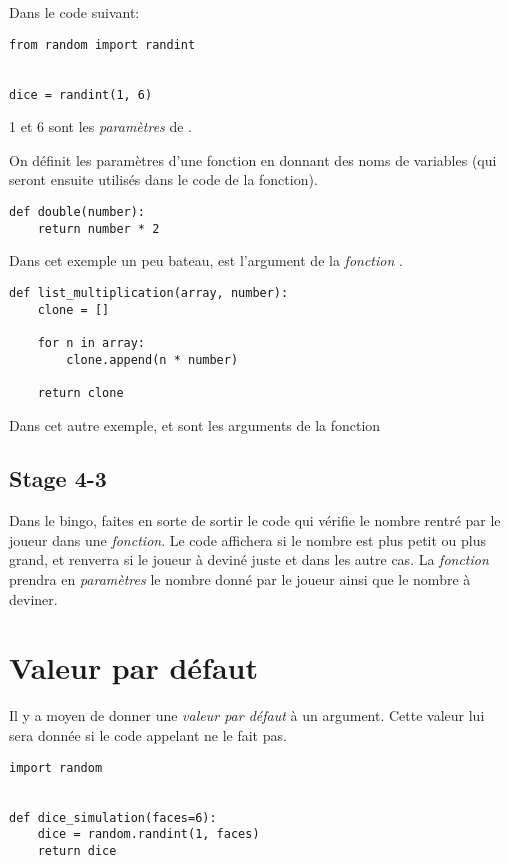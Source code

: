 Dans le code suivant:

\begin{lstlisting}
from random import randint


dice = randint(1, 6)
\end{lstlisting}

1 et 6 sont les \emph{paramètres} de .

On définit les paramètres d'une fonction en donnant des noms de variables (qui seront ensuite utilisés dans le code de la fonction).

\begin{lstlisting}
def double(number):
	return number * 2
\end{lstlisting}

Dans cet exemple un peu bateau,  est l'argument de la \emph{fonction} .

\begin{lstlisting}
def list_multiplication(array, number):
	clone = []
	
	for n in array:
		clone.append(n * number)

	return clone
\end{lstlisting}

Dans cet autre exemple,  et  sont les arguments de la fonction 

\subsection{Stage 4-3}

Dans le bingo, faites en sorte de sortir le code qui vérifie le nombre rentré par le joueur dans une \emph{fonction}.
Le code affichera si le nombre est plus petit ou plus grand, et renverra  si le joueur à deviné juste et  dans les autre cas.
La \emph{fonction} prendra en \emph{paramètres} le nombre donné par le joueur ainsi que le nombre à deviner.

\section{Valeur par défaut}

Il y a moyen de donner une \emph{valeur par défaut} à un argument.
Cette valeur lui sera donnée si le code appelant ne le fait pas.

\begin{lstlisting}
import random


def dice_simulation(faces=6):
	dice = random.randint(1, faces)
	return dice
\end{lstlisting}


